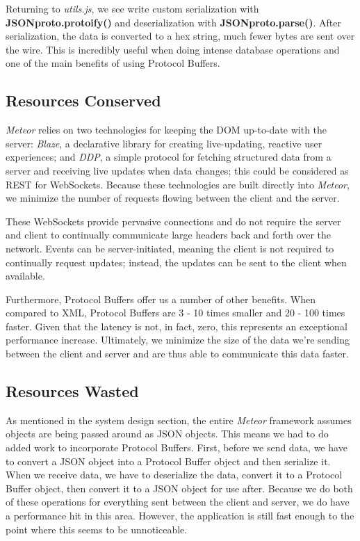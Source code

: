 \documentclass[11pt]{article} %
\begin{document}
Returning to \textit{utils.js}, we see write custom serialization with \textbf{JSONproto.protoify()} and deserialization with \textbf{JSONproto.parse()}. After serialization, the data is converted to a hex string, much fewer bytes are sent over the wire. This is incredibly useful when doing intense database operations and one of the main benefits of using Protocol Buffers.

\subsection{Resources Conserved}

\textit{Meteor} relies on two technologies for keeping the DOM up-to-date with the server: \textit{Blaze}, a declarative library for creating live-updating, reactive user experiences; and \textit{DDP}, a simple protocol for fetching structured data from a server and receiving live updates when data changes; this could be considered as REST for WebSockets. Because these technologies are built directly into \textit{Meteor}, we minimize the number of requests flowing between the client and the server.

These WebSockets provide pervasive connections and do not require the server and client to continually communicate large headers back and forth over the network. Events can be server-initiated, meaning the client is not required to continually request updates; instead, the updates can be sent to the client when available. 

Furthermore, Protocol Buffers offer us a number of other benefits. When compared to XML, Protocol Buffers are 3 - 10 times smaller and 20 - 100 times faster. Given that the latency is not, in fact, zero, this represents an exceptional performance increase. Ultimately, we minimize the size of the data we're sending between the client and server and are thus able to communicate this data faster.

\subsection{Resources Wasted}

As mentioned in the system design section, the entire \textit{Meteor} framework assumes objects are being passed around as JSON objects. This means we had to do added work to incorporate Protocol Buffers. First, before we send data, we have to convert a JSON object into a Protocol Buffer object and then serialize it. When we receive data, we have to deserialize the data, convert it to a Protocol Buffer object, then convert it to a JSON object for use after. Because we do both of these operations for everything sent between the client and server, we do have a performance hit in this area. However, the application is still fast enough to the point where this seems to be unnoticeable.
\end{document}
